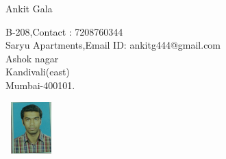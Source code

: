 \documentclass[a4paper,12pt]{article}
\begin{document}
\centering \textsf {\huge{Ankit Gala}}
\noindent\makebox[\linewidth]{\rule{170mm}{0.4pt}}
\begin{flushleft}
{B-208,\hfill{Contact : 7208760344} \\ Saryu Apartments,\hfill{Email ID: ankitg444@gmail.com}\\Ashok nagar\\Kandivali(east) \\Mumbai-400101.}
\end{flushleft}
\hfill\includegraphics[width=20mm,height=20mm]{Untitled}
\end{document}
